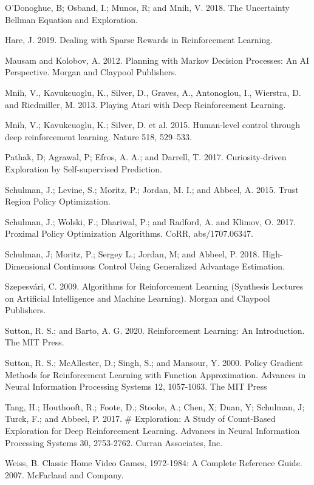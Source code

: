 \documentclass[letterpaper]{article} %
\begin{document}
\smallskip \noindent
O'Donoghue, B; Osband, I.; Munos, R; and Mnih, V. 2018. The Uncertainty Bellman Equation and Exploration.

\smallskip \noindent
Hare, J. 2019. Dealing with Sparse Rewards in Reinforcement Learning.

\smallskip \noindent
Mausam and Kolobov, A. 2012. Planning with Markov Decision Processes: An AI Perspective. Morgan and Claypool Publishers.

\smallskip \noindent
Mnih, V., Kavukcuoglu, K., Silver, D., Graves, A., Antonoglou, I., Wierstra, D. and Riedmiller, M. 2013. Playing Atari with Deep Reinforcement Learning. 

\smallskip \noindent
Mnih, V.; Kavukcuoglu, K.; Silver, D. et al. 2015. Human-level control through deep reinforcement learning. Nature 518, 529–533.

\smallskip \noindent
Pathak, D; Agrawal, P; Efros, A. A.; and Darrell, T. 2017. Curiosity-driven Exploration by Self-supervised Prediction.

\smallskip \noindent
Schulman, J.; Levine, S.; Moritz, P.; Jordan, M. I.; and Abbeel, A. 2015. Trust Region Policy Optimization. 

\smallskip \noindent
Schulman, J.; Wolski, F.; Dhariwal, P.; and Radford, A. and Klimov, O. 2017. Proximal Policy Optimization Algorithms. CoRR, abs/1707.06347. 

\smallskip \noindent
Schulman, J; Moritz, P.; Sergey L.; Jordan, M; and Abbeel, P. 2018. High-Dimensional Continuous Control Using Generalized Advantage Estimation. 

\smallskip \noindent
Szepesvári, C. 2009. Algorithms for Reinforcement Learning (Synthesis Lectures on Artificial Intelligence and Machine Learning). Morgan and Claypool Publishers.

\smallskip \noindent
Sutton, R. S.; and Barto, A. G. 2020. Reinforcement Learning: An Introduction. The MIT Press. 

\smallskip \noindent
Sutton, R. S.; McAllester, D.; Singh, S.; and Mansour, Y. 2000. Policy Gradient Methods for Reinforcement Learning with Function Approximation. Advances in Neural Information Processing Systems 12, 1057-1063. The MIT Press

\smallskip \noindent
Tang, H.; Houthooft, R.; Foote, D.; Stooke, A.; Chen, X; Duan, Y; Schulman, J; Turck, F.; and Abbeel, P. 2017. \# Exploration: A Study of Count-Based Exploration for Deep Reinforcement Learning. Advances in Neural Information Processing Systems 30, 2753-2762. Curran Associates, Inc.

\smallskip \noindent
Weiss, B. Classic Home Video Games, 1972-1984: A Complete Reference Guide. 2007. McFarland and Company.
\end{document}
